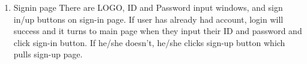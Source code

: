 \begin{enumerate}[label=\arabic*.]
\begin{enumerate}[label*={\arabic*.},ref=\theenumi.\arabic*]
              \item Signin page
                    There are LOGO, ID and Password input windows, and sign in/up buttons on sign-in page. If user has already had account, login will success and it turns to main page when they input their ID and password and click sign-in button. If he/she doesn't, he/she clicks sign-up button which pulls sign-up page.\\\\


\end{enumerate}
\end{enumerate}
